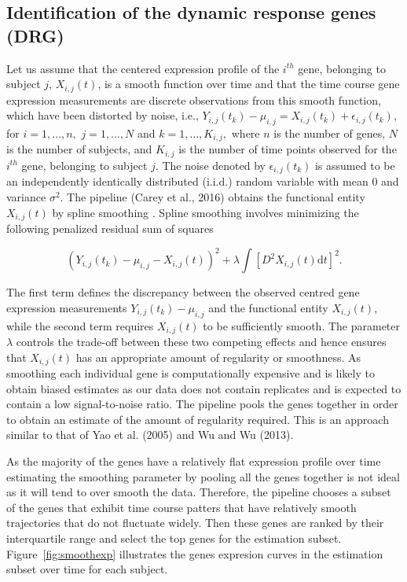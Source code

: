 \subsection{Identification of the dynamic response genes (DRG)}
\label{section:identification_of_drgs}

Let us assume that the centered expression profile of the $i^{th}$ gene, belonging to subject $j$, $X_{i,j}(t)$, is a smooth function over time and that the time course gene expression measurements are discrete observations from this smooth function, which have been distorted by noise, i.e., $Y_{i,j}(t_{k}) -\mu_{i,j} =X_{i,j}(t_{k})+\epsilon_{i,j}(t_{k})$, for $i=1,\ldots,n,$ $j=1,\ldots,N$ and $k=1,\ldots,K_{i,j},$ where $n$ is the number of genes, $N$ is the number of subjects, and $K_{i,j}$ is the number of time points observed for the $i^{th}$ gene, belonging to subject $j$. The noise denoted by $\epsilon_{i,j}(t_{k})$ is assumed to be an independently identically distributed (i.i.d.) random variable with mean $0$ and variance $\sigma^{2}$. The pipeline (Carey et al., 2016) obtains the functional entity $X_{i,j}(t)$ by spline smoothing \citep{green1993nonparametric,silverman2005functional}. Spline smoothing involves minimizing the following penalized residual sum of squares 

\begin{equation}
\label{eq:res_sum_squares}
(Y_{i,j}(t_{k}) -\mu_{i,j} - X_{i,j}(t))^{2} + \lambda \int \left[D^{2} X_{i,j}(t) \textrm{d}t\right]^{2}.
\end{equation}

The first term defines the discrepancy between the observed centred gene expression measurements $Y_{i,j}(t_{k}) -\mu_{i,j}$ and the functional entity $X_{i,j}(t),$ while the second term requires $X_{i,j}(t)$ to be sufficiently smooth. The parameter $\lambda$ controls the trade-off between these two competing effects and hence ensures that $X_{i,j}(t)$ has an appropriate amount of regularity or smoothness. As smoothing each individual gene is computationally expensive and is likely to obtain biased estimates as our data does not contain replicates and is expected to contain a low signal-to-noise ratio. The pipeline pools the genes together in order to obtain an estimate of the amount of regularity required. This is an approach similar to that of Yao et al. (2005) and Wu and Wu (2013).

As the majority of the genes have a relatively flat expression profile over time estimating the smoothing parameter by pooling all the genes together is not ideal as it will tend to over smooth the data. Therefore, the pipeline chooses a subset of the genes that exhibit time course patters that have relatively smooth trajectories that do not fluctuate widely. Then these genes are ranked by their interquartile range and select the top genes for the estimation subset. Figure~\ref{fig:smoothexp} illustrates the genes expresion curves in the estimation subset over time for each subject. 

